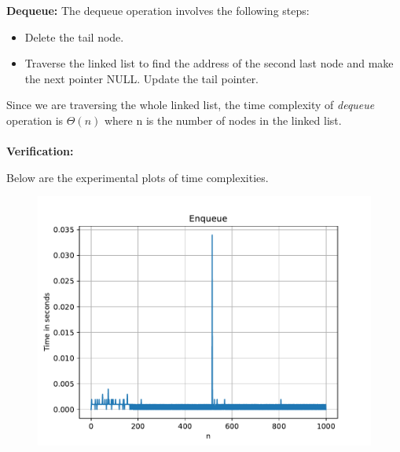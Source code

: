 \documentclass[journal,12pt,twocolumn]{IEEEtran}
\begin{document}
\textbf{Dequeue: } The dequeue operation involves the following steps:
\begin{itemize}
    \item Delete the tail node.
    \item Traverse the linked list to find the address of the second last node and make the next pointer NULL. Update the tail pointer.
\end{itemize}

Since we are traversing the whole linked list, the time 
complexity of \emph{dequeue} operation is $\Theta (n)$ where n is the number of nodes in the linked list.
\\
\\
\textbf{Verification: } 


Below are the experimental plots of time complexities.

\begin{figure}[!ht]
    \begin{center}
    \includegraphics[width=\columnwidth]{./figs/enqueue}
    \end{center}
    \label{fig2}	
\end{figure}
\end{document}
